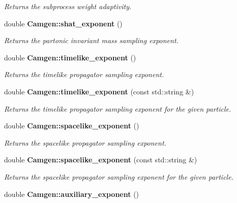 \begin{DoxyCompactItemize}
\begin{DoxyCompactList}\small\item\em Returns the subprocess weight adaptivity. \end{DoxyCompactList}\item 
\hypertarget{a00878_ae4a3ebfc64b6591a69a84781aef94f80}{}double {\bfseries Camgen\+::shat\+\_\+exponent} ()\label{a00878_ae4a3ebfc64b6591a69a84781aef94f80}

\begin{DoxyCompactList}\small\item\em Returns the partonic invariant mass sampling exponent. \end{DoxyCompactList}\item 
\hypertarget{a00878_aca68996421ae280ada5d9bf6966e9857}{}double {\bfseries Camgen\+::timelike\+\_\+exponent} ()\label{a00878_aca68996421ae280ada5d9bf6966e9857}

\begin{DoxyCompactList}\small\item\em Returns the timelike propagator sampling exponent. \end{DoxyCompactList}\item 
double {\bfseries Camgen\+::timelike\+\_\+exponent} (const std\+::string \&)
\begin{DoxyCompactList}\small\item\em Returns the timelike propagator sampling exponent for the given particle. \end{DoxyCompactList}\item 
\hypertarget{a00878_a64fc037fbef0f6cb7bb1771eef05dc9f}{}double {\bfseries Camgen\+::spacelike\+\_\+exponent} ()\label{a00878_a64fc037fbef0f6cb7bb1771eef05dc9f}

\begin{DoxyCompactList}\small\item\em Returns the spacelike propagator sampling exponent. \end{DoxyCompactList}\item 
double {\bfseries Camgen\+::spacelike\+\_\+exponent} (const std\+::string \&)
\begin{DoxyCompactList}\small\item\em Returns the spacelike propagator sampling exponent for the given particle. \end{DoxyCompactList}\item 
\hypertarget{a00878_ab4ad02e88ed91b81dc8a95c9c8f2d587}{}double {\bfseries Camgen\+::auxiliary\+\_\+exponent} ()\label{a00878_ab4ad02e88ed91b81dc8a95c9c8f2d587}


\end{DoxyCompactItemize}
